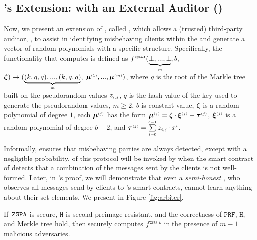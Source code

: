 




\vspace{-2mm}

\subsection{\zspa's Extension: \zspa with an External Auditor (\zspaa)}
\vspace{-1mm}

Now, we present an extension of \zspa, called \zspaa, which allows a (trusted) third-party auditor, \aud, to assist in identifying misbehaving clients within the \zspa and generate a vector of random polynomials with a specific structure. Specifically, the functionality that \zspaa computes is defined as 
%
$f^{\scriptscriptstyle \mathtt{ZSPA\text{-}A}}(\underbrace{\bot,..., \bot}_{\scriptscriptstyle m}, b, $ $\bm\zeta)\rightarrow (\underbrace{(k, g, q),..., (k, g,q)}_{\scriptscriptstyle m},$ $\bm\mu^{\scriptscriptstyle (1)},..., \bm\mu^{\scriptscriptstyle (m)})$, where $g$ is the root of the Markle tree built on the pseudorandom values $z_{\scriptscriptstyle i, j}$, $q$ is the hash value of the key used to generate the pseudorandom values, $m\geq 2$, $b$ is constant value, $\bm\zeta$ is a random polynomial of degree $1$, each $\bm\mu^{\scriptscriptstyle (j)} $ has the form $\bm\mu^{\scriptscriptstyle (j)} = \bm\zeta\cdot \bm\xi^{\scriptscriptstyle (j)}-\bm\tau^{\scriptscriptstyle (j)}$,  $\bm\xi^{\scriptscriptstyle (j)}$ is a random polynomial of degree $b-2$, and $\bm\tau^{\scriptscriptstyle (j)}=\sum\limits^{\scriptscriptstyle b-1}_{\scriptscriptstyle i=0}z_{\scriptscriptstyle i,j}\cdot x^{\scriptscriptstyle i}$. 



Informally, \zspaa ensures that misbehaving parties are always detected, except with a negligible probability. \aud of this protocol will be invoked by \withFai when the smart contract of \withFai detects that a combination of the messages sent by the clients is not well-formed. Later, in \withFai's proof, we will demonstrate that even a \emph{semi-honest} \aud, who observes all messages send by clients to \withFai's smart contracts, cannot learn anything about their set elements. We present \zspaa in Figure \ref{fig:arbiter}. 

\vspace{-1mm}



\vspace{-1mm}
\begin{theorem}\label{theorem::ZSPA-A}
If\ $\mathtt{ZSPA}$ is secure, $\mathtt{H}$ is second-preimage resistant, and the correctness of $\mathtt{PRF}$, $\mathtt{H}$, and Merkle tree hold,  then \zspaa securely computes $f^{\scriptscriptstyle \mathtt{ZSPA\text{-}A}}$ in the presence of $m-1 $ malicious adversaries.%
\end{theorem}

